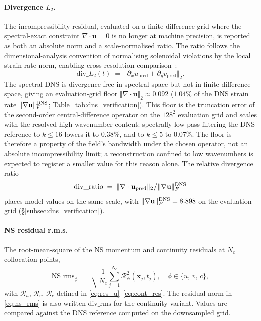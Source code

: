\paragraph{Divergence $L_2$.}
The incompressibility residual, evaluated on a finite-difference grid where the spectral-exact constraint $\nabla\!\cdot\!\mathbf{u} = 0$ is no longer at machine precision, is reported as both an absolute norm and a scale-normalised ratio. The ratio follows the dimensional-analysis convention of normalising solenoidal violations by the local strain-rate norm, enabling cross-resolution comparison~\cite{Pope2000,Moin1998AIAA}:
\begin{equation}
    \mathrm{div}\_L_2(t) \;=\; \big\Vert \partial_x u_{\text{pred}} + \partial_y v_{\text{pred}} \big\Vert_2.
\end{equation}
The spectral DNS is divergence-free in spectral space but not in finite-difference space, giving an evaluation-grid floor $\Vert\nabla\cdot\mathbf{u}\Vert_2 \approx 0.092$ ($1.04\%$ of the DNS strain rate $\Vert\nabla\mathbf{u}\Vert_F^{\rm DNS}$; Table~\ref{tab:dns_verification}). This floor is the truncation error of the second-order central-difference operator on the $128^2$ evaluation grid and scales with the resolved high-wavenumber content: spectrally low-pass filtering the DNS reference to $k\le 16$ lowers it to $0.38\%$, and to $k\le 5$ to $0.07\%$. The floor is therefore a property of the field's bandwidth under the chosen operator, not an absolute incompressibility limit; a reconstruction confined to low wavenumbers is expected to register a smaller value for this reason alone. The relative divergence ratio
\begin{equation}
    \mathrm{div}\_\mathrm{ratio} \;=\; \Vert\nabla\cdot\mathbf{u}_{\rm pred}\Vert_2 \big/ \Vert\nabla\mathbf{u}\Vert_F^{\rm DNS}
\end{equation}
places model values on the same scale, with $\Vert\nabla\mathbf{u}\Vert_F^{\rm DNS} = 8.898$ on the evaluation grid (\S\ref{subsec:dns_verification}).

\paragraph{NS residual r.m.s.}
The root-mean-square of the NS momentum and continuity residuals at $N_c$ collocation points,
\begin{equation}
    \label{eq:ns_rms}
    \mathrm{NS\_rms}_\phi \;=\; \sqrt{\frac{1}{N_c}\sum_{j=1}^{N_c} \mathcal{R}_\phi^2(\mathbf{x}_j,t_j)}, \quad \phi \in \{u,\, v,\, c\},
\end{equation}
with $\mathcal{R}_u$, $\mathcal{R}_v$, $\mathcal{R}_c$ defined in \eqref{eq:res_u}--\eqref{eq:cont_res}. The residual norm in \eqref{eq:ns_rms} is also written $\mathrm{div\_rms}$ for the continuity variant. Values are compared against the DNS reference computed on the downsampled grid.

